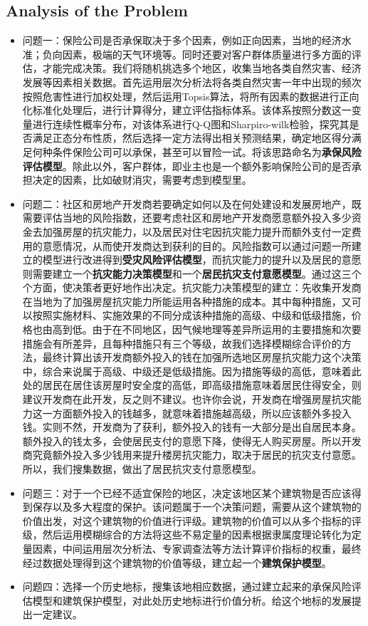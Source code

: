 \documentclass{mcmthesis}
\begin{document}
\subsection{Analysis of the Problem}
\begin{itemize}
	\item 
	问题一：保险公司是否承保取决于多个因素，例如正向因素，当地的经济水准；负向因素，极端的天气环境等。同时还要对客户群体质量进行多方面的评估，才能完成决策。我们将随机挑选多个地区，收集当地各类自然灾害、经济发展等因素相关数据。首先运用层次分析法将各类自然灾害一年中出现的频次按照危害性进行加权处理，然后运用Topsis算法，将所有因素的数据进行正向化标准化处理后，进行计算得分，建立评估指标体系。该体系按照分数这一变量进行连续性概率分布，对该体系进行Q-Q图和Sharpiro-wilk检验，探究其是否满足正态分布性质，然后选择一定方法得出相关预测结果，确定地区得分满足何种条件保险公司可以承保，甚至可以冒险一试。将该思路命名为\textbf{承保风险评估模型}。除此以外，客户群体，即业主也是一个额外影响保险公司的是否承担决定的因素，比如破财消灾，需要考虑到模型里。
	\item 
	问题二：社区和房地产开发商若要确定如何以及在何处建设和发展房地产，既需要评估当地的风险指数，还要考虑社区和房地产开发商愿意额外投入多少资金去加强房屋的抗灾能力，以及居民对住宅因抗灾能力提升而额外支付一定费用的意愿情况，从而使开发商达到获利的目的。风险指数可以通过问题一所建立的模型进行改进得到\textbf{受灾风险评估模型}，而抗灾能力的提升以及居民的意愿则需要建立一个\textbf{抗灾能力决策模型}和一个\textbf{居民抗灾支付意愿模型}。通过这三个个方面，使决策者更好地作出决定。抗灾能力决策模型的建立：先收集开发商在当地为了加强房屋抗灾能力所能运用各种措施的成本。其中每种措施，又可以按照实施材料、实施效果的不同分成该种措施的高级、中级和低级措施，价格也由高到低。由于在不同地区，因气候地理等差异所运用的主要措施和次要措施会有所差异，且每种措施只有三个等级，故我们选择模糊综合评价的方法，最终计算出该开发商额外投入的钱在加强所选地区房屋抗灾能力这个决策中，综合来说属于高级、中级还是低级措施。因为措施等级的高低，意味着此处的居民在居住该房屋时安全度的高低，即高级措施意味着居民住得安全，则建议开发商在此开发，反之则不建议。也许你会说，开发商在增强房屋抗灾能力这一方面额外投入的钱越多，就意味着措施越高级，所以应该额外多投入钱。实则不然，开发商为了获利，额外投入的钱有一大部分是出自居民本身。额外投入的钱太多，会使居民支付的意愿下降，使得无人购买房屋。所以开发商究竟额外投入多少钱用来提升楼房抗灾能力，取决于居民的抗灾支付意愿。所以，我们搜集数据，做出了居民抗灾支付意愿模型。
	\item 
	问题三：对于一个已经不适宜保险的地区，决定该地区某个建筑物是否应该得到保存以及多大程度的保护。该问题属于一个决策问题，需要从这个建筑物的价值出发，对这个建筑物的价值进行评级。建筑物的价值可以从多个指标的评级，然后运用模糊综合的方法将这些不易定量的因素根据隶属度理论转化为定量因素，中间运用层次分析法、专家调查法等方法计算评价指标的权重，最终经过数据处理得到这个建筑物的价值等级，建立起一个\textbf{建筑保护模型}。
	\item
	问题四：选择一个历史地标，搜集该地相应数据，通过建立起来的承保风险评估模型和建筑保护模型，对此处历史地标进行价值分析。给这个地标的发展提出一定建议。
\end{itemize}
\end{document}
